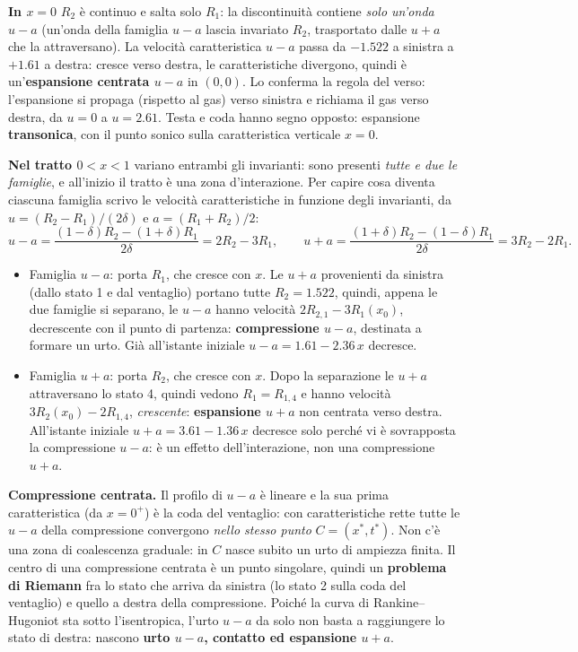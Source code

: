 \documentclass[11pt,a4paper]{article}
\newcommand{\uma}{u-a}
\newcommand{\upa}{u+a}
\begin{document}
\textbf{In $x=0$} $R_2$ è continuo e salta solo $R_1$: la discontinuità contiene \emph{solo un'onda $\uma$}
(un'onda della famiglia $\uma$ lascia invariato $R_2$, trasportato dalle $\upa$ che la attraversano). La
velocità caratteristica $u-a$ passa da $-\num{1.522}$ a sinistra a $+\num{1.61}$ a destra: cresce verso destra,
le caratteristiche divergono, quindi è un'\textbf{espansione centrata $\uma$} in $(0,0)$. Lo conferma la regola
del verso: l'espansione si propaga (rispetto al gas) verso sinistra e richiama il gas verso destra, da $u=0$ a
$u=\num{2.61}$. Testa e coda hanno segno opposto: espansione \textbf{transonica}, con il punto sonico sulla
caratteristica verticale $x=0$.

\textbf{Nel tratto $0<x<1$} variano entrambi gli invarianti: sono presenti \emph{tutte e due le famiglie}, e
all'inizio il tratto è una zona d'interazione. Per capire cosa diventa ciascuna famiglia scrivo le velocità
caratteristiche in funzione degli invarianti, da $u=(R_2-R_1)/(2\delta)$ e $a=(R_1+R_2)/2$:
\[
u-a=\frac{(1-\delta)R_2-(1+\delta)R_1}{2\delta}=2R_2-3R_1,\qquad
u+a=\frac{(1+\delta)R_2-(1-\delta)R_1}{2\delta}=3R_2-2R_1 .
\]
\begin{itemize}
\item Famiglia $\uma$: porta $R_1$, che cresce con $x$. Le $\upa$ provenienti da sinistra (dallo stato 1 e dal
  ventaglio) portano tutte $R_2=\num{1.522}$, quindi, appena le due famiglie si separano, le $\uma$ hanno
  velocità $2R_{2,1}-3R_1(x_0)$, decrescente con il punto di partenza: \textbf{compressione $\uma$}, destinata a
  formare un urto. Già all'istante iniziale $u-a=\num{1.61}-\num{2.36}\,x$ decresce.
\item Famiglia $\upa$: porta $R_2$, che cresce con $x$. Dopo la separazione le $\upa$ attraversano lo stato 4,
  quindi vedono $R_1=R_{1,4}$ e hanno velocità $3R_2(x_0)-2R_{1,4}$, \emph{crescente}: \textbf{espansione $\upa$}
  non centrata verso destra. All'istante iniziale $u+a=\num{3.61}-\num{1.36}\,x$ decresce solo perché vi è
  sovrapposta la compressione $\uma$: è un effetto dell'interazione, non una compressione $\upa$.
\end{itemize}

\textbf{Compressione centrata.} Il profilo di $u-a$ è lineare e la sua prima caratteristica (da $x=0^+$) è la
coda del ventaglio: con caratteristiche rette tutte le $\uma$ della compressione convergono \emph{nello stesso
punto} $C=(x^*,t^*)$. Non c'è una zona di coalescenza graduale: in $C$ nasce subito un urto di ampiezza finita.
Il centro di una compressione centrata è un punto singolare, quindi un \textbf{problema di Riemann} fra lo stato
che arriva da sinistra (lo stato 2 sulla coda del ventaglio) e quello a destra della compressione. Poiché la
curva di Rankine--Hugoniot sta sotto l'isentropica, l'urto $\uma$ da solo non basta a raggiungere lo stato di
destra: nascono \textbf{urto $\uma$, contatto ed espansione $\upa$}.
\end{document}
